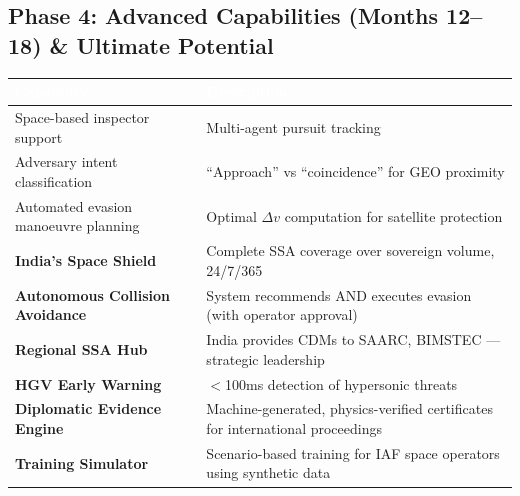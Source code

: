\documentclass[11pt,a4paper]{article}
\newcommand{\TH}[1]{\textcolor{white}{\textbf{#1}}}
\begin{document}
\subsection{Phase 4: Advanced Capabilities (Months 12--18) \& Ultimate Potential}
\begin{table}[H]\centering\small
\begin{tabularx}{\textwidth}{|p{5cm}|X|}
\hline
\rowcolor{dblue}\TH{Capability} & \TH{Description} \\
\hline
Space-based inspector support & Multi-agent pursuit tracking \\
\hline
Adversary intent classification & ``Approach'' vs ``coincidence'' for GEO proximity \\
\hline
Automated evasion manoeuvre planning & Optimal $\Delta v$ computation for satellite protection \\
\hline
\textbf{India's Space Shield} & Complete SSA coverage over sovereign volume, 24/7/365 \\
\hline
\textbf{Autonomous Collision Avoidance} & System recommends AND executes evasion (with operator approval) \\
\hline
\textbf{Regional SSA Hub} & India provides CDMs to SAARC, BIMSTEC --- strategic leadership \\
\hline
\textbf{HGV Early Warning} & $<$100ms detection of hypersonic threats \\
\hline
\textbf{Diplomatic Evidence Engine} & Machine-generated, physics-verified certificates for international proceedings \\
\hline
\textbf{Training Simulator} & Scenario-based training for IAF space operators using synthetic data \\
\hline
\end{tabularx}
\end{table}

\newpage
\appendix
\end{document}
